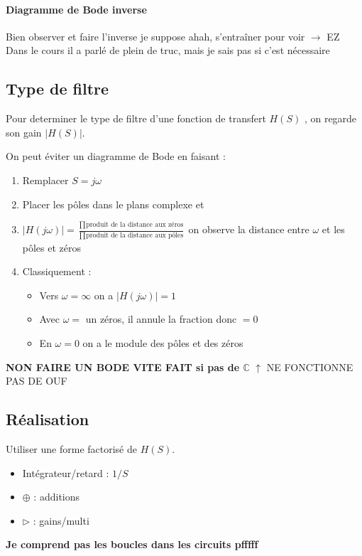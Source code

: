 \documentclass{article}
\theoremstyle{plain}%
\theoremstyle{definition}
\theoremstyle{remark}
\begin{document}
\paragraph*{Diagramme de Bode inverse}
Bien observer et faire l'inverse je suppose ahah, s'entraîner pour voir $\rightarrow$ EZ\\
Dans le cours il a parlé de plein de truc, mais je sais pas si c'est nécessaire

\subsection{Type de filtre}
Pour determiner le type de filtre d'une fonction de transfert $ H(S) $ , on regarde son gain $ \left| H(S) \right| $.

On peut éviter un diagramme de Bode en faisant : 
\begin{enumerate}
    \item Remplacer $ S=j \omega  $ 
    \item Placer les pôles dans le plans complexe et 
    \item $ \left| H(j \omega ) \right| = \frac{\prod_{}^{}\text{produit de la distance aux zéros}}{\prod_{}^{}\text{produit de la distance aux pôles}}  $ on observe la distance entre $ \omega $ et les pôles et zéros
    \item Classiquement : \begin{itemize}
        \item Vers $ \omega = \infty  $ on a $ \left| H(j \omega ) \right| = 1 $ 
        \item Avec $ \omega =  $ un zéros, il annule la fraction donc $ = 0 $ 
        \item En $ \omega = 0 $ on a le module des pôles et des zéros
    \end{itemize}
\end{enumerate}

\textbf{NON FAIRE UN BODE VITE FAIT si pas de $ \mathbb{C} $ } $ \uparrow  $ NE FONCTIONNE PAS DE OUF 

\subsection{Réalisation}
Utiliser une forme factorisé de $ H(S) $. \begin{itemize}
    \item Intégrateur/retard : $ 1/S $ 
    \item $ \oplus $ : additions
    \item $ \rhd $ : gains/multi
\end{itemize}
\textbf{Je comprend pas les boucles dans les circuits pfffff}
\end{document}
